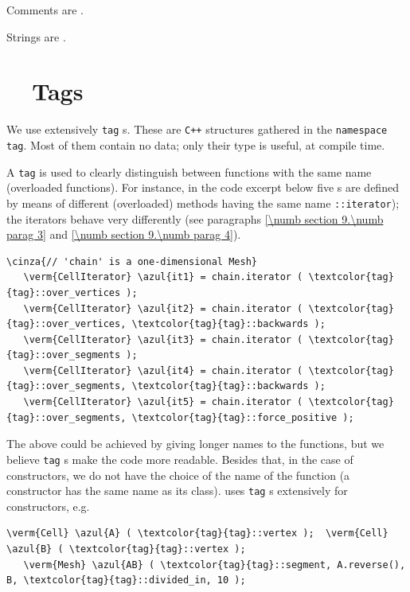 Comments are .

Strings are .


\section{~~Tags}\label{\numb section 11.\numb parag 3}

We use extensively {\small\tt\textcolor{tag}{tag}}\hskip0.8pt s.
These are {\tt C++} structures gathered in the {\small\tt namespace \textcolor{tag}{tag}}.
Most of them contain no data; only their type is useful, at compile time.

A {\small\tt\textcolor{tag}{tag}} is used to clearly distinguish between functions with the same name
(overloaded functions).
For instance, in the code excerpt below five {\small\tt{}}s are defined
by means of different (overloaded) methods having the same name {\small\tt{}::iterator});
the iterators behave very differently (see paragraphs \ref{\numb section 9.\numb parag 3} and
\ref{\numb section 9.\numb parag 4}).

\begin{Verbatim}[commandchars=\\\{\},formatcom=\small\tt,baselinestretch=0.94]
   \cinza{// 'chain' is a one-dimensional Mesh}
   \verm{CellIterator} \azul{it1} = chain.iterator ( \textcolor{tag}{tag}::over_vertices );
   \verm{CellIterator} \azul{it2} = chain.iterator ( \textcolor{tag}{tag}::over_vertices, \textcolor{tag}{tag}::backwards );
   \verm{CellIterator} \azul{it3} = chain.iterator ( \textcolor{tag}{tag}::over_segments );
   \verm{CellIterator} \azul{it4} = chain.iterator ( \textcolor{tag}{tag}::over_segments, \textcolor{tag}{tag}::backwards );
   \verm{CellIterator} \azul{it5} = chain.iterator ( \textcolor{tag}{tag}::over_segments, \textcolor{tag}{tag}::force_positive );
\end{Verbatim}

The above could be achieved by giving longer names to the functions, but we believe
{\small\tt\textcolor{tag}{tag}}\hskip0.8pt s make the code more readable.
Besides that, in the case of constructors, we do not have the choice of the name of the function
(a constructor has the same name as its class).
{\ManiFEM} uses {\small\tt\textcolor{tag}{tag}}\hskip0.8pt s extensively for constructors, e.g.
\begin{Verbatim}[commandchars=\\\{\},formatcom=\small\tt,baselinestretch=0.94]
   \verm{Cell} \azul{A} ( \textcolor{tag}{tag}::vertex );  \verm{Cell} \azul{B} ( \textcolor{tag}{tag}::vertex );
   \verm{Mesh} \azul{AB} ( \textcolor{tag}{tag}::segment, A.reverse(), B, \textcolor{tag}{tag}::divided_in, 10 );
\end{Verbatim}


